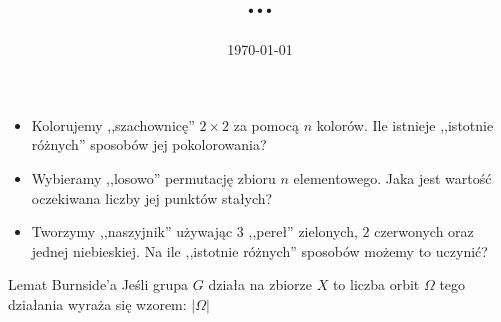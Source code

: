 \documentclass{beamer}
\begin{document}
 
\title[Zliczanie orbit grupy]{
  ...
} 
\author{} 
\date{\today}
\begin{frame} 
  \titlepage 
\end{frame} 
\begin{frame}
\begin{itemize}

\item<1->{
Kolorujemy ,,szachownicę'' $2 \times 2$ za pomocą $n$ kolorów.
Ile istnieje ,,istotnie różnych'' sposobów jej pokolorowania?
}
\item<2->{
Wybieramy ,,losowo'' permutację zbioru $n$ elementowego.
Jaka jest wartość oczekiwana liczby jej punktów stałych?
}
\item<3->{
Tworzymy ,,naszyjnik'' używając $3$ ,,pereł'' zielonych, $2$ czerwonych oraz jednej niebieskiej.
Na ile ,,istotnie różnych'' sposobów możemy to uczynić?
}
\end{itemize}
\end{frame}


\begin{frame}
  \begin{block}{Lemat Burnside'a}
    Jeśli grupa $G$ działa na zbiorze $X$ to
    liczba orbit $\Omega$ tego działania
    wyraża się wzorem:
    $|\Omega|$

  \end{block}
\end{frame}
\end{document}
